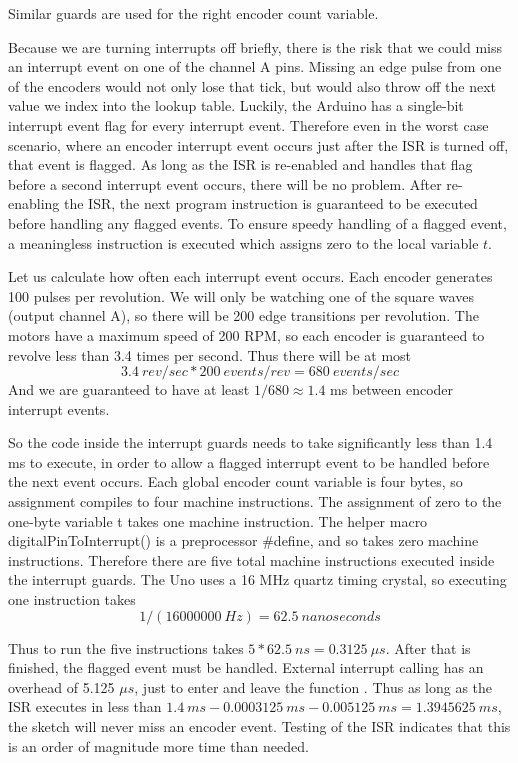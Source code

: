 Similar guards are used for the right encoder count variable. 

Because we are turning interrupts off briefly, there is the risk that we could miss an interrupt event on one of the channel A pins. Missing an edge pulse from one of the encoders would not only lose that tick, but would also throw off the next value we index into the lookup table. Luckily, the Arduino has a single-bit interrupt event flag for every interrupt event. Therefore even in the worst case scenario, where an encoder interrupt event occurs just after the ISR is turned off, that event is flagged. As long as the ISR is re-enabled and handles that flag before a second interrupt event occurs, there will be no problem. After re-enabling the ISR, the next program instruction is guaranteed to be executed before handling any flagged events. To ensure speedy handling of a flagged event, a meaningless instruction is executed which assigns zero to the local variable \(t\).

Let us calculate how often each interrupt event occurs. Each encoder generates 100 pulses per revolution. We will only be watching one of the square waves (output channel A), so there will be 200 edge transitions per revolution. The motors have a maximum speed of 200 RPM, so each encoder is guaranteed to revolve less than 3.4 times per second. Thus there will be at most \[3.4\ rev/sec * 200\ events/rev = 680\ events/sec\]
And we are guaranteed to have at least \(1 / 680 \approx 1.4\) ms between encoder interrupt events.

So the code inside the interrupt guards needs to take significantly less than 1.4 ms to execute, in order to allow a flagged interrupt event to be handled before the next event occurs. Each global encoder count variable is four bytes, so assignment compiles to four machine instructions. The assignment of zero to the one-byte variable t takes one machine instruction. The helper macro digitalPinToInterrupt() is a preprocessor \#define, and so takes zero machine instructions. Therefore there are five total machine instructions executed inside the interrupt guards. The Uno uses a 16 MHz quartz timing crystal, so executing one instruction takes \[1 / (16000000\ Hz) = 62.5\ nanoseconds\]

Thus to run the five instructions takes \(5 * 62.5\ ns = 0.3125\ \mu s\). After that is finished, the flagged event must be handled. External interrupt calling has an overhead of 5.125 \(\mu s\), just to enter and leave the function \cite{gammonInterrupts}. Thus as long as the ISR executes in less than \(1.4\ ms - 0.0003125\ ms - 0.005125\ ms = 1.3945625\ ms\), the sketch will never miss an encoder event. Testing of the ISR indicates that this is an order of magnitude more time than needed.